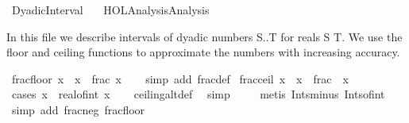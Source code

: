 %
\begin{isabellebody}%
%
%
\isadelimtheory
%
\endisadelimtheory
%
\isatagtheory
{}\isamarkupfalse%
\ Dyadic{\isacharunderscore}{\kern0pt}Interval\isanewline
\ \ \ {\isachardoublequoteopen}HOL{\isacharminus}{\kern0pt}Analysis{\isachardot}{\kern0pt}Analysis{\isachardoublequoteclose}\isanewline
{}%
\endisatagtheory
{\isafoldtheory}%
%
\isadelimtheory
%
\endisadelimtheory
%
\begin{isamarkuptext}%
In this file we describe intervals of dyadic numbers {S..T} for reals S T. We use the floor
  and ceiling functions to approximate the numbers with increasing accuracy.%
\end{isamarkuptext}\isamarkuptrue%
\isamarkupfalse%
\ frac{\isacharunderscore}{\kern0pt}floor{\isacharcolon}{\kern0pt}\ {\isachardoublequoteopen}{\isasymlfloor}x{\isasymrfloor}\ {\isacharequal}{\kern0pt}\ x\ {\isacharminus}{\kern0pt}\ frac\ x{\isachardoublequoteclose}\isanewline
%
\isadelimproof
\ \ %
\endisadelimproof
%
\isatagproof
{}\isamarkupfalse%
\ {\isacharparenleft}{\kern0pt}simp\ add{\isacharcolon}{\kern0pt}\ frac{\isacharunderscore}{\kern0pt}def{\isacharparenright}{\kern0pt}%
\endisatagproof
{\isafoldproof}%
%
\isadelimproof
\isanewline
%
\endisadelimproof
\isanewline
{}\isamarkupfalse%
\ frac{\isacharunderscore}{\kern0pt}ceil{\isacharcolon}{\kern0pt}\ {\isachardoublequoteopen}{\isasymlceil}x{\isasymrceil}\ {\isacharequal}{\kern0pt}\ x\ {\isacharplus}{\kern0pt}\ frac\ {\isacharparenleft}{\kern0pt}{\isacharminus}{\kern0pt}\ x{\isacharparenright}{\kern0pt}{\isachardoublequoteclose}\isanewline
%
\isadelimproof
\ \ %
\endisadelimproof
%
\isatagproof
{}\isamarkupfalse%
\ {\isacharparenleft}{\kern0pt}cases\ {\isachardoublequoteopen}x\ {\isacharequal}{\kern0pt}\ real{\isacharunderscore}{\kern0pt}of{\isacharunderscore}{\kern0pt}int\ {\isasymlfloor}x{\isasymrfloor}{\isachardoublequoteclose}{\isacharparenright}{\kern0pt}\isanewline
\ \ \isamarkupfalse%
\ ceiling{\isacharunderscore}{\kern0pt}altdef\ \isamarkupfalse%
\ simp\isanewline
\ \ \ \isamarkupfalse%
\ {\isacharparenleft}{\kern0pt}metis\ Ints{\isacharunderscore}{\kern0pt}minus\ Ints{\isacharunderscore}{\kern0pt}of{\isacharunderscore}{\kern0pt}int{\isacharparenright}{\kern0pt}\isanewline
\ \ \isamarkupfalse%
\ {\isacharparenleft}{\kern0pt}simp\ add{\isacharcolon}{\kern0pt}\ frac{\isacharunderscore}{\kern0pt}neg\ frac{\isacharunderscore}{\kern0pt}floor{\isacharparenright}{\kern0pt}\isanewline

\end{isabellebody}
